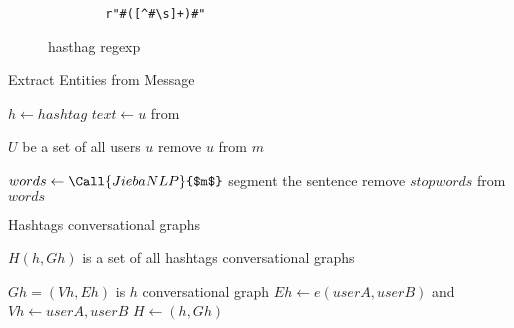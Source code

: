 

\begin{figure}
    \caption{hasthag regexp}
    \label{alg:hasthag regexp}
    \begin{verbatim}
        r"#([^#\s]+)#" 
    \end{verbatim}
\end{figure}

\begin{algorithm}[H]
    \caption{Extract Entities from Message}
    \label{algo:message-graph}
    \begin{algorithmic}


            
                \State $h\gets hashtag$
                \State $text\gets u$ from 
            \EndIf

                \State $U$ be a set of all users $u$
                \State remove $u$ from $m$
            \EndIf

            \State $words \gets \Call{Jieba NLP}{$m$}$ segment the sentence
            \State remove $stopwords$ from $words$

        \EndFunction
    \end{algorithmic}
\end{algorithm}

\begin{algorithm}[H]
    \caption{Hashtags conversational graphs}
    \label{algo:hashtags-graph}
    \begin{algorithmic}
        \State $H(h,Gh)$ is a set of all hashtags conversational graphs


                    \State $Gh=(Vh,Eh)$ is $h$ conversational graph
                        \State $Eh \gets e(userA,userB)$ and $Vh \gets userA,userB $
                    \EndIf
                    \State $H \gets (h,Gh)$ 
                \EndIf
            \EndFor
        \EndFunction
    \end{algorithmic}
\end{algorithm}

